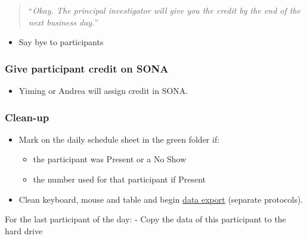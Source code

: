 \documentclass[]{article}
\providecommand{\tightlist}{%
  \setlength{\itemsep}{0pt}\setlength{\parskip}{0pt}}
\begin{document}
\begin{quote}
``\emph{Okay. The principal investigator will give you the credit by the
end of the next business day.}''
\end{quote}

\begin{itemize}
\tightlist
\item
  Say bye to participants
\end{itemize}

\subsubsection{Give participant credit on
SONA}\label{give-participant-credit-on-sona}

\begin{itemize}
\tightlist
\item
  Yiming or Andrea will assign credit in SONA.
\end{itemize}

\subsubsection{Clean-up}\label{clean-up}

\begin{itemize}
\tightlist
\item
  Mark on the daily schedule sheet in the green folder if:

  \begin{itemize}
  \tightlist
  \item
    the participant was Present or a No Show\\
  \item
    the number used for that participant if Present
  \end{itemize}
\item
  Clean keyboard, mouse and table and begin
  \href{sex-differences-data-export.md}{data export} (separate
  protocols).
\end{itemize}

For the last participant of the day: - Copy the data of this participant
to the hard drive
\end{document}
